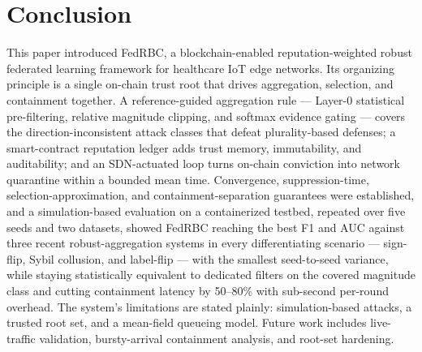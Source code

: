 \documentclass[cmc,article,submit,moreauthors,pdftex]{Definitions/tsp}
\begin{document}
\section{Conclusion}\label{sec:conclusion}

This paper introduced FedRBC, a blockchain-enabled reputation-weighted robust federated learning framework for healthcare IoT edge networks. Its organizing principle is a single on-chain trust root that drives aggregation, selection, and containment together. A reference-guided aggregation rule --- Layer-0 statistical pre-filtering, relative magnitude clipping, and softmax evidence gating --- covers the direction-inconsistent attack classes that defeat plurality-based defenses; a smart-contract reputation ledger adds trust memory, immutability, and auditability; and an SDN-actuated loop turns on-chain conviction into network quarantine within a bounded mean time. Convergence, suppression-time, selection-approximation, and containment-separation guarantees were established, and a simulation-based evaluation on a containerized testbed, repeated over five seeds and two datasets, showed FedRBC reaching the best F1 and AUC against three recent robust-aggregation systems in every differentiating scenario --- sign-flip, Sybil collusion, and label-flip --- with the smallest seed-to-seed variance, while staying statistically equivalent to dedicated filters on the covered magnitude class and cutting containment latency by 50--80\% with sub-second per-round overhead. The system's limitations are stated plainly: simulation-based attacks, a trusted root set, and a mean-field queueing model. Future work includes live-traffic validation, bursty-arrival containment analysis, and root-set hardening.




\end{document}
